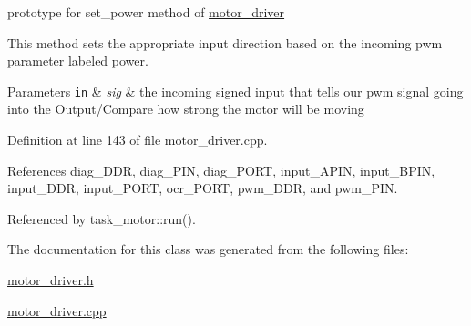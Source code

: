 prototype for set\-\_\-power method of \hyperlink{classmotor__driver}{motor\-\_\-driver} 

This method sets the appropriate input direction based on the incoming pwm parameter labeled power.


\begin{DoxyParams}[1]{Parameters}
\mbox{\tt in}  & {\em sig} & the incoming signed input that tells our pwm signal going into the Output/\-Compare how strong the motor will be moving \\
\hline
\end{DoxyParams}


Definition at line 143 of file motor\-\_\-driver.\-cpp.



References diag\-\_\-\-D\-D\-R, diag\-\_\-\-P\-I\-N, diag\-\_\-\-P\-O\-R\-T, input\-\_\-\-A\-P\-I\-N, input\-\_\-\-B\-P\-I\-N, input\-\_\-\-D\-D\-R, input\-\_\-\-P\-O\-R\-T, ocr\-\_\-\-P\-O\-R\-T, pwm\-\_\-\-D\-D\-R, and pwm\-\_\-\-P\-I\-N.



Referenced by task\-\_\-motor\-::run().



The documentation for this class was generated from the following files\-:\begin{DoxyCompactItemize}
\item 
\hyperlink{motor__driver_8h}{motor\-\_\-driver.\-h}\item 
\hyperlink{motor__driver_8cpp}{motor\-\_\-driver.\-cpp}\end{DoxyCompactItemize}
